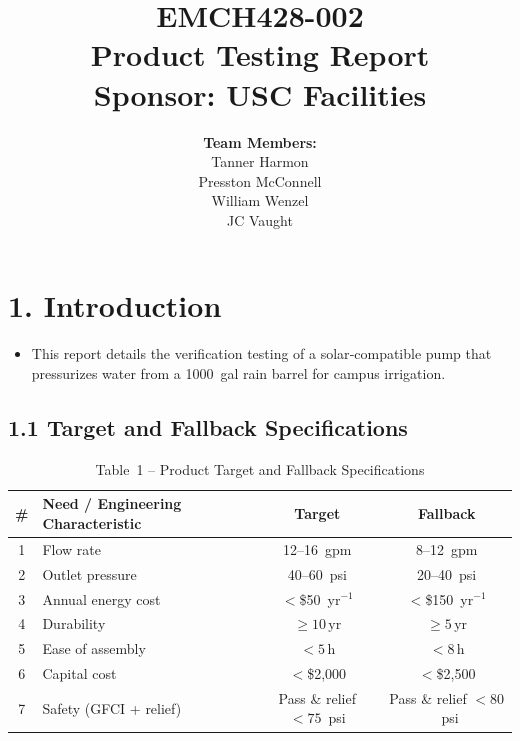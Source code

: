 \documentclass[12pt]{article}
\begin{document}
\title{
  \vspace{2in}
  \textbf{EMCH428-002} \\[1ex]
  \textbf{Product Testing Report} \\[1ex]
  \textbf{Sponsor: USC Facilities} \\[1ex]
  \vspace{2in}
}
\author{
  \textbf{Team Members:} \\[2ex]
  Tanner Harmon\\[1ex]
  Presston McConnell\\[1ex]
  William Wenzel\\[1ex]
  JC Vaught\\[2ex]
}
\date{}
\maketitle
\thispagestyle{fancy}

\newpage
\setcounter{page}{2}

\section*{1. Introduction}
\begin{itemize}[leftmargin=*]
  \item This report details the verification testing of a solar‐compatible pump that pressurizes water from a 1000 gal rain barrel for campus irrigation.
\end{itemize}

\subsection*{1.1 Target and Fallback Specifications}
\begin{table}[h]
  \centering
  \caption*{Table 1 -- Product Target and Fallback Specifications}
  \begin{tabular}{@{}clcc@{}}
    \toprule
    \# & Need / Engineering Characteristic & Target & Fallback \\
    \midrule
    1 & Flow rate              & 12–16 gpm & 8–12 gpm \\
    2 & Outlet pressure        & 40–60 psi & 20–40 psi \\
    3 & Annual energy cost     & $<$\$50 yr$^{-1}$ & $<$\$150 yr$^{-1}$ \\
    4 & Durability             & $\ge10\,\mathrm{yr}$ & $\ge5\,\mathrm{yr}$ \\
    5 & Ease of assembly       & $<5\,\mathrm{h}$ & $<8\,\mathrm{h}$ \\
    6 & Capital cost           & $<$\$2{,}000 & $<$\$2{,}500 \\
    7 & Safety (GFCI + relief) & Pass \& relief $<75$ psi & Pass \& relief $<80$ psi \\
    \bottomrule
  \end{tabular}
\end{table}
\end{document}
